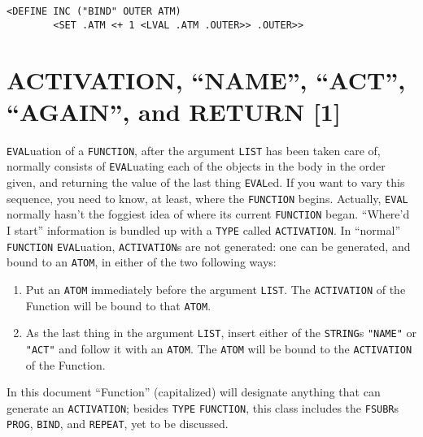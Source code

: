 \documentclass[a4paper]{scrbook}
\providecommand{\tightlist}{%
  \setlength{\itemsep}{0pt}\setlength{\parskip}{0pt}}
\begin{document}
\begin{verbatim}
<DEFINE INC ("BIND" OUTER ATM)
        <SET .ATM <+ 1 <LVAL .ATM .OUTER>> .OUTER>>
\end{verbatim}

\section{\texorpdfstring{ACTIVATION, ``NAME'', ``ACT'', ``AGAIN'', and RETURN
{[}1{]}}{9.8. ACTIVATION, NAME, ACT, AGAIN, and RETURN {[}1{]}}}\label{activation-name-act-again-and-return-1}

   \texttt{EVAL}uation of a
\texttt{FUNCTION}, after the argument \texttt{LIST} has been taken care of, normally consists of
\texttt{EVAL}uating each of the objects in the body in the order given, and returning the value of the last thing
\texttt{EVAL}ed. If you want to vary this sequence, you need to know, at least, where the \texttt{FUNCTION} begins.
Actually, \texttt{EVAL} normally hasn't the foggiest idea of where its current \texttt{FUNCTION} began. ``Where'd I start''
information is bundled up with a \texttt{TYPE} called \texttt{ACTIVATION}. In ``normal'' \texttt{FUNCTION}
\texttt{EVAL}uation, \texttt{ACTIVATION}s are not generated: one can be generated, and bound to an \texttt{ATOM}, in either
of the two following ways:

\begin{enumerate}
\def\labelenumi{\arabic{enumi}.}
\tightlist
\item
  Put an \texttt{ATOM} immediately before the argument \texttt{LIST}. The \texttt{ACTIVATION} of the Function will be bound
  to that \texttt{ATOM}.
\item
  As the last thing in the argument \texttt{LIST}, insert either of the \texttt{STRING}s \texttt{"NAME"}
   or \texttt{"ACT"} and follow it with an \texttt{ATOM}. The \texttt{ATOM} will be bound
  to the \texttt{ACTIVATION} of the Function.
\end{enumerate}

In this document ``Function'' (capitalized) will designate anything that can generate an
\texttt{ACTIVATION}; besides \texttt{TYPE} \texttt{FUNCTION}, this class includes the \texttt{FSUBR}s
\texttt{PROG}, \texttt{BIND}, and \texttt{REPEAT}, yet to
be discussed.
\end{document}
